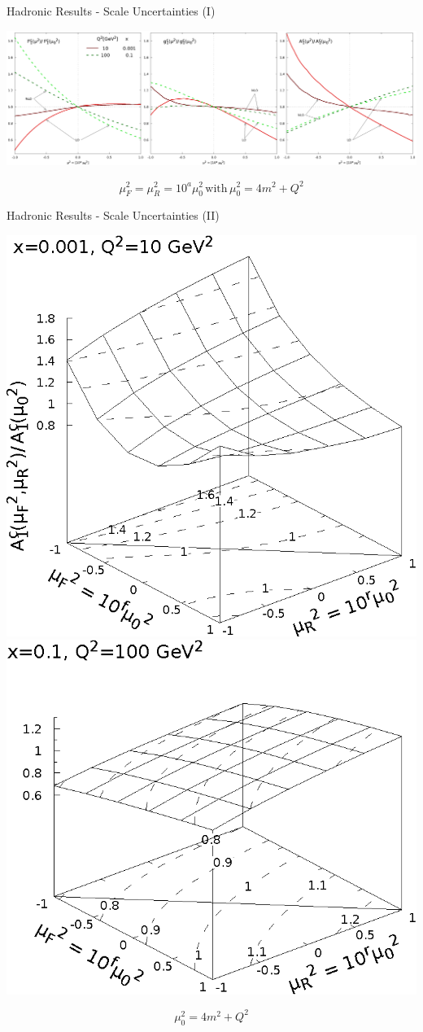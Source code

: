 \begin{frame}{Hadronic Results - Scale Uncertainties (I)}
\begin{center}
\includegraphics[width=\textwidth]{img/F1g1A1-mu2}
\end{center}
\[\mu_F^2 = \mu_R^2 = 10^a\mu_0^2\,\text{with}\,\mu_0^2=4m^2+Q^2\]
\end{frame}

\begin{frame}{Hadronic Results - Scale Uncertainties (II)}
\begin{center}
\includegraphics[width=.48\textwidth]{img/A1-muF2-muR2-x_3-q2_1}
\includegraphics[width=.48\textwidth]{img/A1-muF2-muR2-x_1-q2_2}
\end{center}
\[\mu_0^2=4m^2+Q^2\]
\end{frame}
